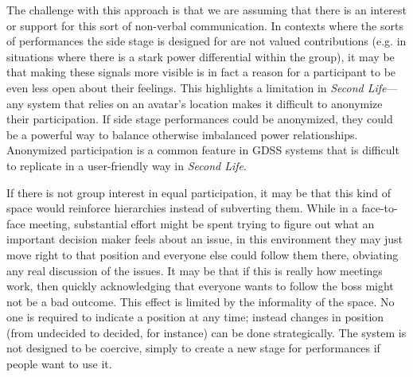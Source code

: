The challenge with this approach is that we are assuming that there is an interest or support for this sort of non-verbal communication. In contexts where the sorts of performances the side stage is designed for are not valued contributions (e.g. in situations where there is a stark power differential within the group), it may be that making these signals more visible is in fact a reason for a participant to be even less open about their feelings. This highlights a limitation in \emph{Second Life}---any system that relies on an avatar's location makes it difficult to anonymize their participation. If side stage performances could be anonymized, they could be a powerful way to balance otherwise imbalanced power relationships. Anonymized participation is a common feature in GDSS systems that is difficult to replicate in a user-friendly way in \emph{Second Life}.

If there is not group interest in equal participation, it may be that this kind of space would reinforce hierarchies instead of subverting them. While in a face-to-face meeting, substantial effort might be spent trying to figure out what an important decision maker feels about an issue, in this environment they may just move right to that position and everyone else could follow them there, obviating any real discussion of the issues. It may be that if this is really how meetings work, then quickly acknowledging that everyone wants to follow the boss might not be a bad outcome. This effect is limited by the informality of the space. No one is required to indicate a position at any time; instead changes in position (from undecided to decided, for instance) can be done strategically. The system is not designed to be coercive, simply to create a new stage for performances if people want to use it.

